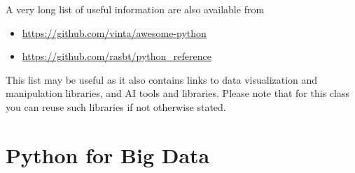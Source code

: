 A very long list of useful information are also available from
\begin{itemize}
\item {} 
\url{https://github.com/vinta/awesome-python}

\item {} 
\url{https://github.com/rasbt/python\_reference}

\end{itemize}

This list may be useful as it also contains links to data
visualization and manipulation libraries, and AI tools and libraries.
Please note that for this class you can reuse such libraries if not
otherwise stated.


\section{Python for Big Data}
\label{\detokenize{lesson/prg/python_big_data:python-for-big-data}}\label{\detokenize{lesson/prg/python_big_data::doc}}\label{\detokenize{lesson/prg/python_big_data:learn-python}}
